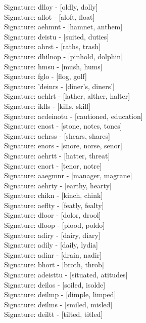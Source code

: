 Signature: {dlloy} - [oldly, dolly] \\
Signature: {aflot} - [aloft, float] \\
Signature: {aehmnt} - [hamnet, anthem] \\
Signature: {deistu} - [suited, duties] \\
Signature: {ahrst} - [raths, trash] \\
Signature: {dhilnop} - [pinhold, dolphin] \\
Signature: {hmsu} - [mush, hums] \\
Signature: {fglo} - [flog, golf] \\
Signature: {'deinrs} - [diner's, diners'] \\
Signature: {aehlrt} - [lather, alther, halter] \\
Signature: {iklls} - [kills, skill] \\
Signature: {acdeinotu} - [cautioned, education] \\
Signature: {enost} - [stone, notes, tones] \\
Signature: {aehrss} - [shears, shares] \\
Signature: {enors} - [snore, norse, senor] \\
Signature: {aehrtt} - [hatter, threat] \\
Signature: {enort} - [tenor, notre] \\
Signature: {aaegmnr} - [manager, magrane] \\
Signature: {aehrty} - [earthy, hearty] \\
Signature: {chikn} - [kinch, chink] \\
Signature: {aeflty} - [featly, fealty] \\
Signature: {dloor} - [dolor, drool] \\
Signature: {dloop} - [plood, poldo] \\
Signature: {adiry} - [dairy, diary] \\
Signature: {adily} - [daily, lydia] \\
Signature: {adinr} - [drain, nadir] \\
Signature: {bhort} - [broth, throb] \\
Signature: {adeisttu} - [situated, atitudes] \\
Signature: {deilos} - [soiled, isolde] \\
Signature: {deilmp} - [dimple, limped] \\
Signature: {deilms} - [smiled, misled] \\
Signature: {deiltt} - [tilted, titled] \\
